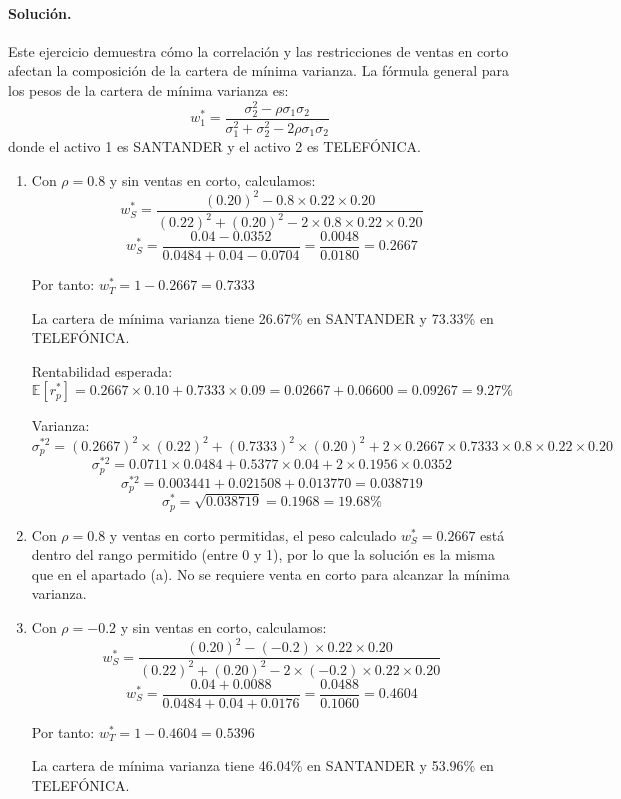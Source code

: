 \documentclass[12pt,a4paper]{article}
\newcommand{\E}{\mathbb{E}}
\newenvironment{solucion}{\paragraph{Solución.}}{}
\begin{document}
\begin{solucion}
Este ejercicio demuestra cómo la correlación y las restricciones de ventas en corto afectan la composición de la cartera de mínima varianza. La fórmula general para los pesos de la cartera de mínima varianza es:
\[
w_1^* = \frac{\sigma_2^2 - \rho \sigma_1 \sigma_2}{\sigma_1^2 + \sigma_2^2 - 2\rho \sigma_1 \sigma_2}
\]
donde el activo 1 es SANTANDER y el activo 2 es TELEFÓNICA.

\begin{enumerate}[label=\alph*)]
  \item Con $\rho = 0.8$ y sin ventas en corto, calculamos:
  \[
  w_S^* = \frac{(0.20)^2 - 0.8 \times 0.22 \times 0.20}{(0.22)^2 + (0.20)^2 - 2 \times 0.8 \times 0.22 \times 0.20}
  \]
  \[
  w_S^* = \frac{0.04 - 0.0352}{0.0484 + 0.04 - 0.0704} = \frac{0.0048}{0.0180} = 0.2667
  \]
  
  Por tanto: $w_T^* = 1 - 0.2667 = 0.7333$

  La cartera de mínima varianza tiene 26.67\% en SANTANDER y 73.33\% en TELEFÓNICA.

  Rentabilidad esperada:
  \[
  \E[r_p^*] = 0.2667 \times 0.10 + 0.7333 \times 0.09 = 0.02667 + 0.06600 = 0.09267 = 9.27\%
  \]

  Varianza:
  \[
  \sigma_p^{*2} = (0.2667)^2 \times (0.22)^2 + (0.7333)^2 \times (0.20)^2 + 2 \times 0.2667 \times 0.7333 \times 0.8 \times 0.22 \times 0.20
  \]
  \[
  \sigma_p^{*2} = 0.0711 \times 0.0484 + 0.5377 \times 0.04 + 2 \times 0.1956 \times 0.0352
  \]
  \[
  \sigma_p^{*2} = 0.003441 + 0.021508 + 0.013770 = 0.038719
  \]
  \[
  \sigma_p^* = \sqrt{0.038719} = 0.1968 = 19.68\%
  \]

  \item Con $\rho = 0.8$ y ventas en corto permitidas, el peso calculado $w_S^* = 0.2667$ está dentro del rango permitido (entre 0 y 1), por lo que la solución es la misma que en el apartado (a). No se requiere venta en corto para alcanzar la mínima varianza.

  \item Con $\rho = -0.2$ y sin ventas en corto, calculamos:
  \[
  w_S^* = \frac{(0.20)^2 - (-0.2) \times 0.22 \times 0.20}{(0.22)^2 + (0.20)^2 - 2 \times (-0.2) \times 0.22 \times 0.20}
  \]
  \[
  w_S^* = \frac{0.04 + 0.0088}{0.0484 + 0.04 + 0.0176} = \frac{0.0488}{0.1060} = 0.4604
  \]
  
  Por tanto: $w_T^* = 1 - 0.4604 = 0.5396$

  La cartera de mínima varianza tiene 46.04\% en SANTANDER y 53.96\% en TELEFÓNICA.


\end{enumerate}
\end{solucion}
\end{document}
